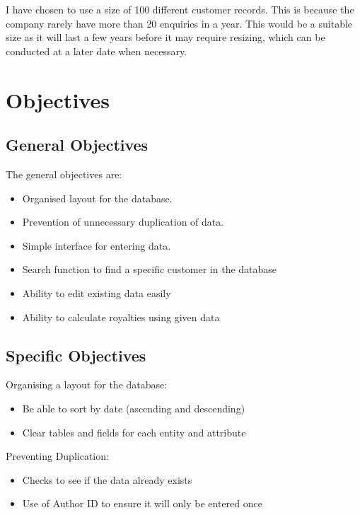 I have chosen to use a size of 100 different customer records. This is because the company rarely have more than 20 enquiries in a year. This would be a suitable size as it will last a few years before it may require resizing, which can be conducted at a later date when necessary.

\section{Objectives}

\subsection{General Objectives}

The general objectives are:
\begin{itemize}
    \item Organised layout for the database.
    \item Prevention of unnecessary duplication of data.
    \item Simple interface for entering data.
    \item Search function to find a specific customer in the database
    \item Ability to edit existing data easily
    \item Ability to calculate royalties using given data
\end{itemize}

\subsection{Specific Objectives}

Organising a layout for the database:

\begin{itemize}
    \item Be able to sort by date (ascending and descending)
    \item Clear tables and fields for each entity and attribute
\end{itemize}


Preventing Duplication:

\begin{itemize}
    \item Checks to see if the data already exists
    \item Use of Author ID to ensure it will only be entered once
\end{itemize}


